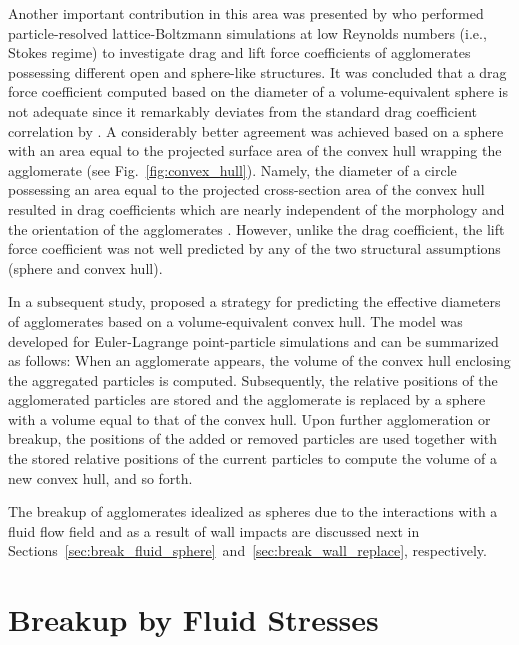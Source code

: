 Another important contribution in this area was presented by
\citet{dietzel2013numerical} who performed particle-resolved
lattice-Boltzmann simulations at low Reynolds numbers (i.e., Stokes
regime) to investigate drag and lift force coefficients of
agglomerates possessing different open and sphere-like structures. It
was concluded that a drag force coefficient computed based on the
diameter of a volume-equivalent sphere is not adequate since it
remarkably deviates from the standard drag coefficient correlation by
\citet{schiller33}.  A considerably better agreement was achieved
based on a sphere with an area equal to the projected surface area of
the convex hull wrapping the agglomerate (see
Fig.~\ref{fig:convex_hull}). Namely, the diameter of a circle
possessing an area equal to the projected cross-section area of the
convex hull resulted in drag coefficients which are nearly independent
of the morphology and the orientation of the agglomerates
\citep{dietzel2013numerical,dietzel2016application}. However, unlike
the drag coefficient, the lift force coefficient was not well
predicted by any of the two structural assumptions (sphere and convex
hull).

In a subsequent study, \citet{sommerfeld2017novel} proposed a
strategy for predicting the effective diameters of agglomerates based
on a volume-equivalent convex hull. The model was developed for
Euler-Lagrange point-particle simulations and can be summarized as
follows: When an agglomerate appears, the volume of the convex hull
enclosing the aggregated particles is computed. Subsequently, the
relative positions of the agglomerated particles are stored and the
agglomerate is replaced by a sphere with a volume equal to that of the
convex hull. Upon further agglomeration or breakup, the positions of
the added or removed particles are used together with the stored
relative positions of the current particles to compute the volume of a
new convex hull, and so forth. \newline

The breakup of agglomerates idealized as spheres due to the
interactions with a fluid flow field and as a result of wall impacts
are discussed next in
Sections~\ref{sec:break_fluid_sphere}~and~\ref{sec:break_wall_replace},
respectively.

\section{Breakup by Fluid Stresses}
\label{sec:litrev_fluidstress}

